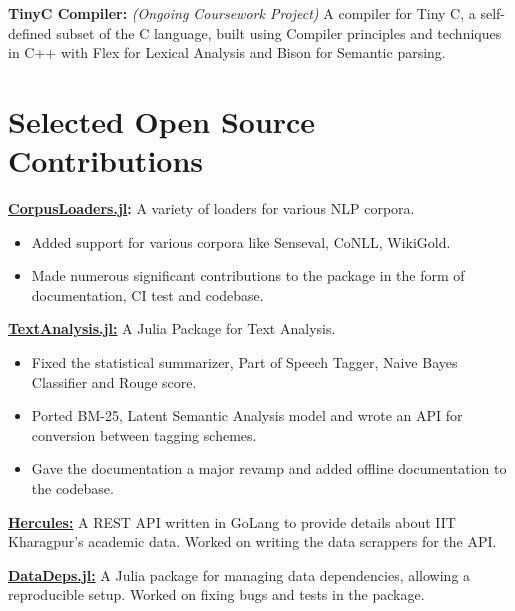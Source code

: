 \documentclass[a4paper,10pt]{extarticle} %
\begin{document}
\textbf{TinyC Compiler:}
\textit{(Ongoing Coursework Project)}
A compiler for Tiny C, a self-defined subset of the C language, built using Compiler principles and techniques in C++ with Flex for Lexical Analysis and Bison for Semantic parsing. \\

\vspace{-0.3cm}
\section{\textcolor{primary}{Selected Open Source Contributions}}

\textbf{\href{https://github.com/JuliaText/CorpusLoaders.jl}{CorpusLoaders.jl}:} A variety of loaders for various NLP corpora.
    \begin{itemize}[leftmargin=.2in]
        \item Added support for various corpora like Senseval, CoNLL, WikiGold.
        \item Made numerous significant contributions to the package in the form of documentation, CI test and codebase.
    \end{itemize}
\textbf{\href{https://github.com/JuliaText/TextAnalysis.jl}{TextAnalysis.jl:}} A Julia Package for Text Analysis.
    \begin{itemize}[leftmargin=.2in]
        \item Fixed the statistical summarizer, Part of Speech Tagger, Naive Bayes Classifier and Rouge score.
        \item Ported BM-25, Latent Semantic Analysis model and wrote an API for conversion between tagging schemes.
        \item Gave the documentation a major revamp and added offline documentation to the codebase.
    \end{itemize}

\textbf{\href{https://github.com/kshitij10496/hercules/}{Hercules:}} A REST API written in GoLang to provide details about IIT Kharagpur's academic data. Worked on writing the data scrappers for the API.

\textbf{\href{https://github.com/oxinabox/DataDeps.jl}{DataDeps.jl:}} A Julia package for managing data dependencies, allowing a reproducible setup. Worked on fixing bugs and tests in the package.\\
\end{document}
